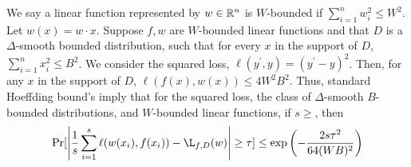 We say a linear function represented by $w \in \mathbb{R}^n$ is $W$-bounded if
$\sum_{i=1}^n w_i^2 \leq W^2$. Let $w(x) = w \cdot x$. Suppose $f, w$ are
$W$-bounded linear functions and that $D$ is a $\Delta$-smooth bounded
distribution, such that for every $x$ in the support of $D$, $\sum_{i=1}^n x_i^2
\leq B^2$. We consider the squared loss, $\ell(y^\prime, y) = (y^\prime - y)^2$.
Then, for any $x$ in the support of $D$, $\ell(f(x), w(x)) \leq 4 W^2B^2$. Thus,
standard Hoeffding bound's imply that for the squared loss, the class of
$\Delta$-smooth $B$-bounded distributions, and $W$-bounded linear functions, if
$s \geq $, then 
\[ 
\Pr[\left| \frac{1}{s} \sum_{i=1}^s \ell(w(x_i), f(x_i)) - \L_{f, D}(w) \right|
\geq \tau ] \leq \exp\left( -\frac{2 s \tau^2}{64(WB)^2}\right)
\]

% 

